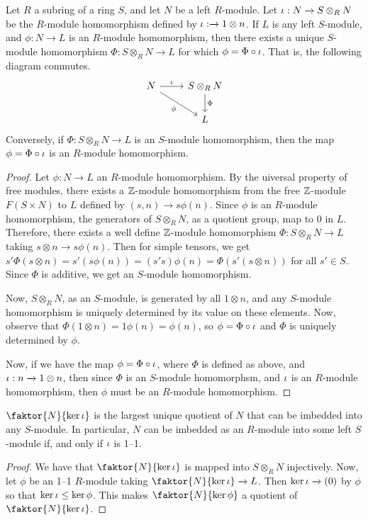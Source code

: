 \begin{theorem}\label{4.4.3}
    Let $R$ a subring of a ring $S$, and let $N$ be a left $R$-module. Let $\iota:N
    \xrightarrow{} S \otimes_R N$ be the $R$-module homomorphism defined by $\iota:
    \xrightarrow{} 1 \otimes n$. If $L$ is any left $S$-module, and $\phi:N
    \xrightarrow{} L$ is an $R$-module homomorphism, then there exists a unique
    $S$-module homomorphism $\Phi:S \otimes_R N \xrightarrow{} L$ for which
    $\phi=\Phi \circ \iota$. That is, the following diagram commutes.
    \[\begin{tikzcd}
        N & {S \otimes_R N} \\
        & L
        \arrow["\iota", from=1-1, to=1-2]
        \arrow["\Phi", from=1-2, to=2-2]
        \arrow["\phi"', from=1-1, to=2-2]
    \end{tikzcd}\]
    Conversely, if $\Phi:S \otimes_R N \xrightarrow{} L$ is an $S$-module
    homomorphism, then the map $\phi=\Phi \circ \iota$ is an $R$-module
    homomorphism.
\end{theorem}
\begin{proof}
    Let $\phi:N \xrightarrow{} L$ an $R$-module homomorphism. By the uiversal
    property of free modules, there exists a $\mathbb{Z}$-module homomorphism from the
    free $\mathbb{Z}$-module $F(S \times N)$ to  $L$ defined by $(s,n) \xrightarrow{}
    s\phi(n)$. Since $\phi$ is an $R$-module homomorphism, the generators of $S
    \otimes_R N$, as a quotient group, map to $0$ in $L$. Therefore, there
    exists a well define $\mathbb{Z}$-module homomorphism $\Phi:S \otimes_R N
    \xrightarrow{} L$ taking $s \otimes n \xrightarrow{} s\phi(n)$. Then for
    simple tensors, we get $s'\Phi(s \otimes
    n)=s'(s\phi(n))=(s's)\phi(n)=\Phi(s'(s \otimes n))$ for all $s' \in S$.
    Since $\Phi$ is additive, we get an $S$-module homomorphism.

    Now, $S \otimes_R N$, as an $S$-module, is generated by all $1 \otimes n$,
    and any $S$-module homomorphism is uniquely determined by its value on these
    elements. Now, observe that $\Phi(1 \otimes n)=1\phi(n)=\phi(n)$, so
    $\phi=\Phi \circ \iota$ and $\Phi$ is uniquely determined by $\phi$.

    Now, if we have the map $\phi=\Phi \circ \iota$, where $\Phi$ is defined as
    above, and $\iota:n \xrightarrow{} 1 \otimes n$, then since $\Phi$ is an
    $S$-module homomorphsm, and $\iota$ is an $R$-module homomorphism, then $\phi$
    must be an $R$-module homomorphism.
\end{proof}
\begin{corollary}
    $\faktor{N}{\ker{\i}}$ is the largest unique quotient of $N$ that can be
    imbedded into any $S$-module. In particular, $N$ can be imbedded as an
    $R$-module into some left $S$-module if, and only if $\iota$ is 1--1.
\end{corollary}
\begin{proof}
    We have that $\faktor{N}{\ker{\i}}$ is mapped into $S \otimes_R N$
    injectively. Now, let $\phi$ be an 1--1 $R$-module taking
    $\faktor{N}{\ker{\i}} \xrightarrow{} L$. Then $\ker{\iota} \xrightarrow{} (0)$
    by $\phi$ so that $\ker{\iota} \leq \ker{\phi}$. This makes
    $\faktor{N}{\ker{\phi}}$ a quotient of $\faktor{N}{\ker{\i}}$.
\end{proof}

